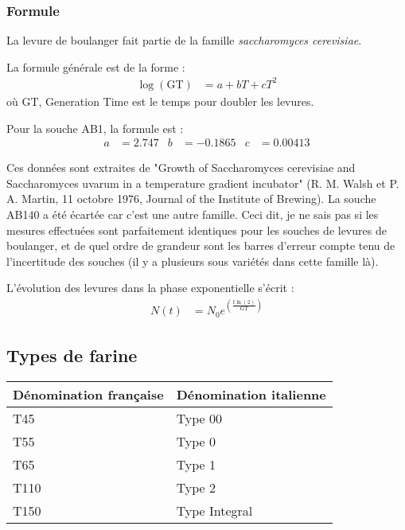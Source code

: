 \documentclass[a4paper,twoside,openright]{report}
\begin{document}
\subsubsection{Formule}
La levure de boulanger fait partie de la famille \emph{saccharomyces cerevisiae}.

La formule générale est de la forme :
\begin{align}
\log(\mathrm{GT}) &= a + bT + cT^2
\end{align}
où GT, Generation Time est le temps pour doubler les levures.

Pour la souche AB1, la formule est :
\begin{align}
a&= 2.747 & b&= -0.1865 & c&= 0.00413
\end{align}

Ces données sont extraites de "Growth of Saccharomyces cerevisiae and Saccharomyces uvarum in a temperature gradient incubator" (R. M. Walsh et P. A. Martin, 11 octobre 1976, Journal of the Institute of Brewing). La souche AB140 a été écartée car c'est une autre famille. Ceci dit, je ne sais pas si les mesures effectuées sont parfaitement identiques pour les souches de levures de boulanger, et de quel ordre de grandeur sont les barres d'erreur compte tenu de l'incertitude des souches (il y a plusieurs sous variétés dans cette famille là).

L'évolution des levures dans la phase exponentielle s'écrit :
\begin{align}
N(t) &= N_0 e^{\left(\frac{t\ln(2)}{\mathrm{GT}}\right)}
\end{align}

\subsection{Types de farine}

\begin{center}
\begin{tabular}{|l|l|}\hline
Dénomination française & Dénomination italienne\\\hline
T45      &  Type 00   \\\hline
T55      &  Type 0       \\\hline
T65      &  Type 1      \\\hline
T110     &  Type 2           \\\hline
T150     &  Type Integral         \\\hline
\end{tabular}
\end{center}
\end{document}
